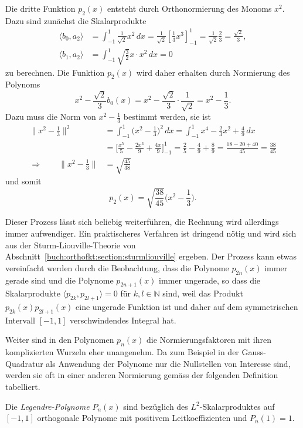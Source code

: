 Die dritte Funktion $p_2(x)$ entsteht durch Orthonormierung des
Monoms $x^2$.
Dazu sind zunächst die Skalarprodukte
\begin{align*}
\langle b_0,a_2\rangle
&=
\int_{-1}^1 \frac{1}{\!\sqrt{2}}x^2\,dx
=
\frac{1}{\!\sqrt{2}} [\frac13x^3]_{-1}^1
=
\frac{1}{\!\sqrt{2}} \frac{2}{3}
=
\frac{\!\sqrt{2}}{3},
\\
\langle b_1,a_2\rangle
&=
\int_{-1}^1 \!\sqrt{\frac{3}{2}} x \cdot x^2\,dx
= 
0
\end{align*}
zu berechnen.
Die Funktion $p_2(x)$ wird daher erhalten durch Normierung des Polynoms
\[
x^2 - 
\frac{\!\sqrt{2}}{3} b_0(x)
=
x^2-
\frac{\!\sqrt{2}}{3}\cdot\frac{1}{\!\sqrt{2}}
=
x^2-\frac13.
\]
Dazu muss die Norm von $x^2-\frac13$ bestimmt werden, sie ist
\begin{align*}
\|x^2-\frac13\|^2
&=
\int_{-1}^1 \biggl(x^2-{\textstyle\frac13}\biggr)^2\,dx
=
\int_{-1}^1 x^4-\frac23x^2+\frac{4}{9}\,dx
\\
&=
\biggl[\frac{x^5}{5} -\frac{2x^3}{9}+\frac{4x}{9}\biggr]_{-1}^1
=
\frac{2}{5} - \frac{4}{9} + \frac{8}{9}
=
\frac{18-20+40}{45}
=
\frac{38}{45}
\\
\Rightarrow\qquad
\|x^2-{\textstyle\frac13}\|
&=
\!\sqrt{\frac{45}{38}}
\end{align*}
und somit
\[
p_2(x)
= 
\!\sqrt{\frac{38}{45}} \biggl(x^2-\frac13\biggr).
\]

Dieser Prozess lässt sich beliebig weiterführen, die Rechnung wird
allerdings immer aufwendiger.
Ein praktischeres Verfahren ist dringend nötig und wird sich
aus der Sturm-Liouville-Theorie von
Abschnitt~\ref{buch:orthofkt:section:sturmliouville} ergeben.
Der Prozess kann etwas vereinfacht werden durch die Beobachtung, dass die
Polynome $p_{2n}(x)$ immer gerade sind und die Polynome $p_{2n+1}(x)$
immer ungerade, so dass die Skalarprodukte 
$\langle p_{2k},p_{2l+1}\rangle=0$ für $k,l\in\mathbb{N}$ sind,
weil das Produkt $p_{2k}(x)p_{2l+1}(x)$ eine ungerade Funktion ist
und daher auf dem symmetrischen Intervall $[-1,1]$ verschwindendes
Integral hat.

Weiter sind in den Polynomen $p_n(x)$ die Normierungsfaktoren mit
ihren komplizierten Wurzeln eher unangenehm.
Da zum Beispiel in der Gauss-Quadratur als Anwendung der Polynome
nur die Nullstellen von Interesse sind, werden sie oft in einer
anderen Normierung gemäss der folgenden Definition tabelliert.

\begin{definition}
Die {\em Legendre-Polynome} $P_n(x)$ sind bezüglich des
$L^2$-Skalar\-pro\-duk\-tes 
auf $[-1,1]$ orthogonale Polynome mit positivem Leitkoeffizienten und
$P_n(1)=1$.
\end{definition}

